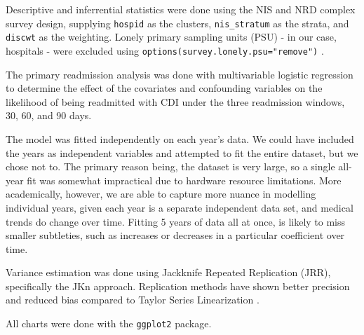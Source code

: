 Descriptive and inferrential statistics were done using the NIS and NRD complex survey design, 
supplying \texttt{hospid} as the clusters, \texttt{nis\_stratum} as the strata, and \texttt{discwt} as the weighting. 
Lonely primary sampling units (PSU) - in our case, hospitals - were excluded using \texttt{options(survey.lonely.psu="remove")} \cite{LonelyPSUs}.

The primary readmission analysis was done with multivariable logistic regression to determine the effect of the covariates and confounding variables
on the likelihood of being readmitted with CDI under the three readmission windows, 30, 60, and 90 days. 

The model was fitted independently on each year's data. 
We could have included the years as independent variables and attempted to fit the entire dataset, but we chose not to. The primary reason being, the dataset is very large,
so a single all-year fit was somewhat impractical due to hardware resource limitations. More academically, however, we are able to capture more nuance in modelling individual
years, given each year is a separate independent data set, and medical trends do change over time. Fitting 5 years of data all at once, is likely to miss smaller subtleties, 
such as increases or decreases in a particular coefficient over time. 

Variance estimation was done using Jackknife Repeated Replication (JRR), specifically the JKn approach. Replication methods have shown better
precision and reduced bias compared to Taylor Series Linearization \cite{Chowdhury2013, Smith2000}.

All charts were done with the \texttt{ggplot2} package. 
